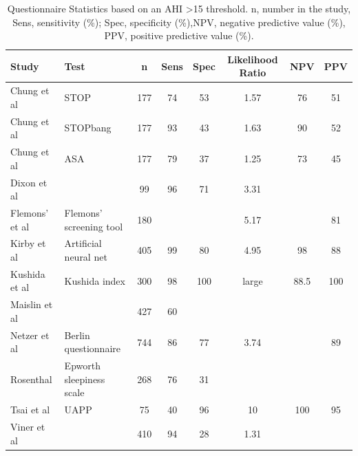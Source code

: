 \begin{table}[h]
\centering
\begin{tabular}{l l c c c c c c}
\toprule
Study&Test&n&Sens&Spec&Likelihood Ratio&NPV&PPV\\ \midrule
Chung et al&STOP&177&74&53&1.57&76&51\\ 
Chung et al&STOPbang&177&93&43&1.63&90&52\\ 
Chung et al&ASA&177&79&37&1.25&73&45\\ 
Dixon et al&&99&96&71&3.31&&\\ 
Flemons' et al&Flemons' screening tool&180&&&5.17&&81\\ 
Kirby et al&Artificial neural net&405&99&80&4.95&98&88\\ 
Kushida et al&Kushida index&300&98&100&large&88.5&100\\ 
Maislin et al&&427&60&&&&\\ 
Netzer et al&Berlin questionnaire&744&86&77&3.74&&89\\ 
Rosenthal&Epworth sleepiness scale&268&76&31&&&\\ 
Tsai et al&UAPP&75&40&96&10&100&95\\ 
Viner et al&&410&94&28&1.31&&\\ \bottomrule
\end{tabular}
\caption{Questionnaire Statistics based on an AHI \textgreater 15 threshold. n, number in the study, Sens, sensitivity (\%); Spec, specificity (\%),NPV, negative predictive value (\%), PPV, positive predictive value (\%).}
\label{table:questionnaire}
\end{table}
